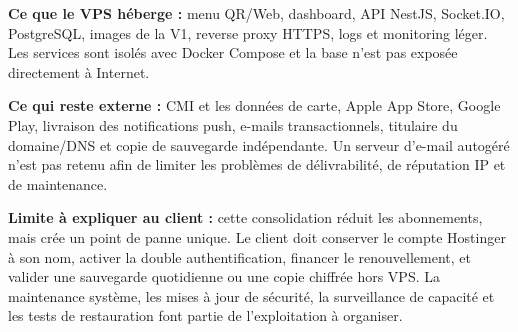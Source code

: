 \documentclass[10pt,a4paper]{article}
\begin{document}
\textbf{Ce que le VPS héberge :} menu QR/Web, dashboard, API NestJS, Socket.IO, PostgreSQL, images de la V1, reverse proxy HTTPS, logs et monitoring léger. Les services sont isolés avec Docker Compose et la base n'est pas exposée directement à Internet.

\textbf{Ce qui reste externe :} CMI et les données de carte, Apple App Store, Google Play, livraison des notifications push, e-mails transactionnels, titulaire du domaine/DNS et copie de sauvegarde indépendante. Un serveur d'e-mail autogéré n'est pas retenu afin de limiter les problèmes de délivrabilité, de réputation IP et de maintenance.

\textbf{Limite à expliquer au client :} cette consolidation réduit les abonnements, mais crée un point de panne unique. Le client doit conserver le compte Hostinger à son nom, activer la double authentification, financer le renouvellement, et valider une sauvegarde quotidienne ou une copie chiffrée hors VPS. La maintenance système, les mises à jour de sécurité, la surveillance de capacité et les tests de restauration font partie de l'exploitation à organiser.
\end{document}
